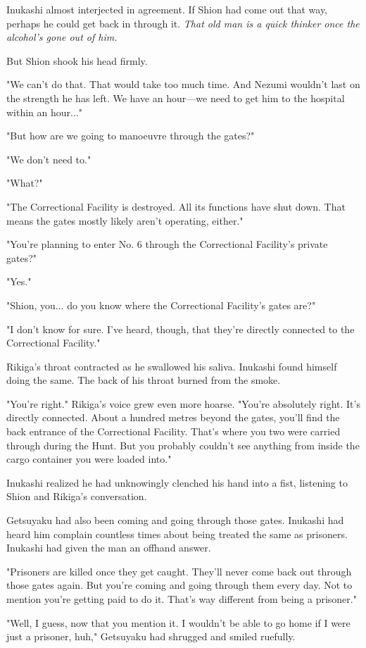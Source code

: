 Inukashi almost interjected in agreement. If Shion had come out that
way, perhaps he could get back in through it. \emph{That old man is a quick
thinker once the alcohol's gone out of him.}

But Shion shook his head firmly.

"We can't do that. That would take too much time. And Nezumi wouldn't
last on the strength he has left. We have an hour---we need to get him to
the hospital within an hour..."

"But how are we going to manoeuvre through the gates?"

"We don't need to."

"What?"

"The Correctional Facility is destroyed. All its functions have shut
down. That means the gates mostly likely aren't operating, either."

"You're planning to enter No. 6 through the Correctional Facility's
private gates?"

"Yes."

"Shion, you... do you know where the Correctional Facility's gates are?"

"I don't know for sure. I've heard, though, that they're directly
connected to the Correctional Facility."

Rikiga's throat contracted as he swallowed his saliva. Inukashi found
himself doing the same. The back of his throat burned from the smoke.

"You're right." Rikiga's voice grew even more hoarse. "You're absolutely
right. It's directly connected. About a hundred metres beyond the gates,
you'll find the back entrance of the Correctional Facility. That's where
you two were carried through during the Hunt. But you probably couldn't
see anything from inside the cargo container you were loaded into."

Inukashi realized he had unknowingly clenched his hand into a fist,
listening to Shion and Rikiga's conversation.

Getsuyaku had also been coming and going through those gates. Inukashi
had heard him complain countless times about being treated the same as
prisoners. Inukashi had given the man an offhand answer.

"Prisoners are killed once they get caught. They'll never come back out
through those gates again. But you're coming and going through them
every day. Not to mention you're getting paid to do it. That's way
different from being a prisoner."

"Well, I guess, now that you mention it. I wouldn't be able to go home
if I were just a prisoner, huh," Getsuyaku had shrugged and smiled
ruefully.

